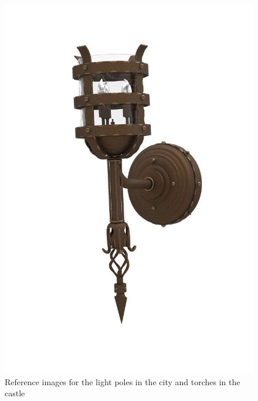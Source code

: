 \begin{figure}
  \includegraphics{Images/Landmarks/torch}
  \caption{Reference images for the light poles in the city and torches in the castle}
\end{figure}